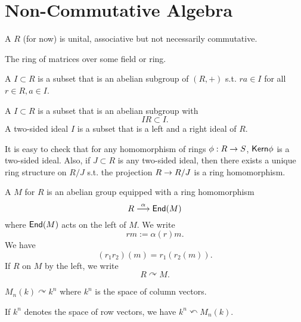 \newpage
\section{Non-Commutative Algebra}
\begin{definition}
A  $R$ (for now) is unital, associative but not necessarily commutative.
\end{definition}
\begin{example}
The ring of matrices over some field or ring.
\end{example}

\begin{definition}
A  $I \subset R$ is a subset that is an abelian subgroup of $(R,+)$ s.t. $ra \in I$ for all $r \in R, a \in I$.

A  $I\subset R$ is a subset that is an abelian subgroup with
\[ IR \subset I. \]
A two-sided ideal $I$ is a subset that is a left and a right ideal of $R$.
\end{definition}

It is easy to check that for any homomorphism of rings $\phi : R\overset{}{\rightarrow} S$, $\textsf{Kern} \phi$ is a two-sided ideal. Also, if $J \subset R$ is any two-sided ideal, then  there exists a unique ring structure on $R /J$ s.t. the projection $R \overset{}{\rightarrow} R/J$ is a ring homomorphism.

\begin{definition}
A  $M$ for $R$ is an abelian group equipped with a ring homomorphism
\[ R \overset{\alpha}{\longrightarrow} \textsf{End}(M)\]
where $\textsf{End}(M)$ acts on the left of $M$. We write
\[ rm:= \alpha(r) m. \]
We have
\[ (r_1r_2)(m) = r_1(r_2(m)). \]
If $R$  on $M$ by the left, we write
\[ R \curvearrowright M. \]
\end{definition}
\begin{example}
	$M_n(k) \curvearrowright k^n$ where $k^n$ is the space of column vectors.
	
	If $k^n$ denotes the space of row vectors, we have $k^n \curvearrowleft M_n(k)$.
\end{example}

